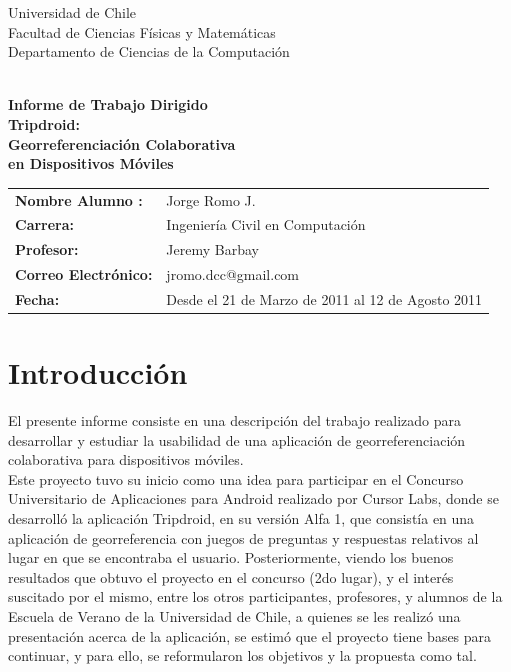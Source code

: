\documentclass[10pt,letterpaper]{article}
\begin{document}
\begin{titlepage}
\begin{minipage}{12cm} Universidad de Chile
\\ Facultad de Ciencias F\'isicas y Matem\'aticas
\\ Departamento de Ciencias de la Computaci\'on\\
\\
\end{minipage}
\vspace*{2cm}
\begin{center}
\vspace{0.2cm}
{\Large \bf\vspace{0.5cm} Informe de Trabajo Dirigido}\\
{\Huge\bf\vspace{0.3cm} Tripdroid:}\\
{\Huge\bf\vspace{0.3cm} Georreferenciación Colaborativa}\\
{\Huge\bf\vspace{0.2cm} en Dispositivos Móviles}\\

\end{center}
\vspace{4cm}
\begin{tabular}{ll}
\bf{Nombre Alumno :}& Jorge Romo J. \\
\bf{Carrera:} & Ingeniería Civil en Computación\\ 
\bf{Profesor:} & Jeremy Barbay  \\ 
\bf{Correo Electrónico:} & jromo.dcc@gmail.com  \\ 
\bf{Fecha:} & Desde el 21 de Marzo de 2011 al 12 de Agosto 2011  \\ 
\end{tabular}
\end{titlepage}
\newpage
\tableofcontents
\setcounter{tocdepth}{1}

\newpage
\section{Introducción}

El presente informe consiste en una descripción del trabajo realizado para desarrollar y estudiar la usabilidad de una aplicación de georreferenciación colaborativa para dispositivos móviles.\\

Este proyecto tuvo su inicio como una idea para participar en el Concurso Universitario de Aplicaciones para Android realizado por Cursor Labs, donde se desarrolló la aplicación Tripdroid, en su versión Alfa 1, que consistía en una aplicación de georreferencia con juegos de preguntas y respuestas relativos al lugar en que se encontraba el usuario. Posteriormente, viendo los buenos resultados que obtuvo el proyecto en el concurso (2do lugar), y el interés suscitado por el mismo, entre los otros participantes, profesores, y alumnos de la Escuela de Verano de la Universidad de Chile, a quienes se les realizó una presentación acerca de la aplicación, se estimó que el proyecto tiene bases para continuar, y para ello, se reformularon los objetivos y la propuesta como tal.\\
\end{document}
